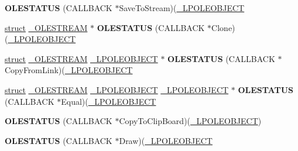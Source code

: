 \begin{DoxyCompactItemize}
{\bfseries O\+L\+E\+S\+T\+A\+T\+US} (C\+A\+L\+L\+B\+A\+CK $\ast$Save\+To\+Stream)(\hyperlink{struct___o_l_e_o_b_j_e_c_t}{\+\_\+\+L\+P\+O\+L\+E\+O\+B\+J\+E\+CT}
\item 
\mbox{\label{struct___o_l_e_o_b_j_e_c_t_v_t_b_l_a2a1aa4b06c3578a7d503283ab819b5a9}} 
\hyperlink{interfacestruct}{struct} \hyperlink{struct___o_l_e_s_t_r_e_a_m}{\+\_\+\+O\+L\+E\+S\+T\+R\+E\+AM} $\ast$ {\bfseries O\+L\+E\+S\+T\+A\+T\+US} (C\+A\+L\+L\+B\+A\+CK $\ast$Clone)(\hyperlink{struct___o_l_e_o_b_j_e_c_t}{\+\_\+\+L\+P\+O\+L\+E\+O\+B\+J\+E\+CT}
\item 
\mbox{\label{struct___o_l_e_o_b_j_e_c_t_v_t_b_l_a9d87e2344c07a4086b981860f2361791}} 
\hyperlink{interfacestruct}{struct} \hyperlink{struct___o_l_e_s_t_r_e_a_m}{\+\_\+\+O\+L\+E\+S\+T\+R\+E\+AM} \hyperlink{struct___o_l_e_o_b_j_e_c_t}{\+\_\+\+L\+P\+O\+L\+E\+O\+B\+J\+E\+CT} $\ast$ {\bfseries O\+L\+E\+S\+T\+A\+T\+US} (C\+A\+L\+L\+B\+A\+CK $\ast$Copy\+From\+Link)(\hyperlink{struct___o_l_e_o_b_j_e_c_t}{\+\_\+\+L\+P\+O\+L\+E\+O\+B\+J\+E\+CT}
\item 
\mbox{\label{struct___o_l_e_o_b_j_e_c_t_v_t_b_l_a6a76e409ebd115b6c8c38ef96805278b}} 
\hyperlink{interfacestruct}{struct} \hyperlink{struct___o_l_e_s_t_r_e_a_m}{\+\_\+\+O\+L\+E\+S\+T\+R\+E\+AM} \hyperlink{struct___o_l_e_o_b_j_e_c_t}{\+\_\+\+L\+P\+O\+L\+E\+O\+B\+J\+E\+CT} \hyperlink{struct___o_l_e_o_b_j_e_c_t}{\+\_\+\+L\+P\+O\+L\+E\+O\+B\+J\+E\+CT} $\ast$ {\bfseries O\+L\+E\+S\+T\+A\+T\+US} (C\+A\+L\+L\+B\+A\+CK $\ast$Equal)(\hyperlink{struct___o_l_e_o_b_j_e_c_t}{\+\_\+\+L\+P\+O\+L\+E\+O\+B\+J\+E\+CT}
\item 
\mbox{\label{struct___o_l_e_o_b_j_e_c_t_v_t_b_l_a8a50f6b807b891e5f0c1037fd2c72c69}} 
{\bfseries O\+L\+E\+S\+T\+A\+T\+US} (C\+A\+L\+L\+B\+A\+CK $\ast$Copy\+To\+Clip\+Board)(\hyperlink{struct___o_l_e_o_b_j_e_c_t}{\+\_\+\+L\+P\+O\+L\+E\+O\+B\+J\+E\+CT})
\item 
\mbox{\label{struct___o_l_e_o_b_j_e_c_t_v_t_b_l_aa792ba96f1f8f7a7bd00b9382df8c567}} 
{\bfseries O\+L\+E\+S\+T\+A\+T\+US} (C\+A\+L\+L\+B\+A\+CK $\ast$Draw)(\hyperlink{struct___o_l_e_o_b_j_e_c_t}{\+\_\+\+L\+P\+O\+L\+E\+O\+B\+J\+E\+CT}
\item 

\end{DoxyCompactItemize}
